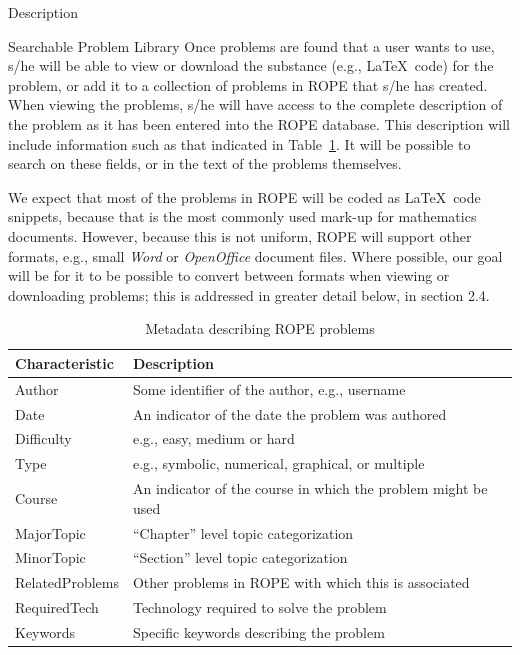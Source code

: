 \documentclass[11pt]{article}
\begin{document}
\begin{section}{Description}
\begin{subsection}{Searchable Problem Library}
Once problems are found that a user wants to use, s/he will be able to
view or download the substance (e.g., \LaTeX\ code) for the problem, or
add it to a collection of problems in ROPE that s/he has created.  When
viewing the problems, s/he will have access to the complete description of
the problem as it has been entered into the ROPE database.  This
description will include information such as that indicated in
Table~\ref{metadata}.  It will be possible to search on these fields, or
in the text of the problems themselves.

We expect that most of the problems in ROPE will be coded as \LaTeX\ code
snippets, because that is the most commonly used mark-up for mathematics
documents.  However, because this is not uniform, ROPE will
support other formats, e.g., small \emph{Word} or \emph{OpenOffice}
document files.  Where possible, our goal will be for it to be possible to
convert between formats when viewing or downloading problems; this is
addressed in greater detail below, in section 2.4.

\begin{center}
\begin{table}
\begin{tabular}{|l|l|}
  \hline
  \textbf{Characteristic} & \textbf{Description} \\
  \hline
  Author & Some identifier of the author, e.g., username \\
  Date   & An indicator of the date the problem was authored \\
  Difficulty & e.g., easy, medium or hard \\
  Type & e.g., symbolic, numerical, graphical, or multiple \\
  Course & An indicator of the course in which the problem might be used \\
  MajorTopic & ``Chapter'' level topic categorization \\
  MinorTopic & ``Section'' level topic categorization \\
  RelatedProblems & Other problems in ROPE with which this is associated \\
  RequiredTech & Technology required to solve the problem \\
  Keywords & Specific keywords describing the problem \\
  \hline
\end{tabular}
\caption{Metadata describing ROPE problems}
\label{metadata}
\end{table}
\end{center}


\end{subsection}
\end{section}
\end{document}
